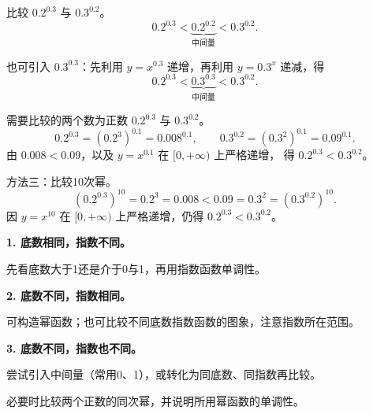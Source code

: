 \begin{frame}[t,label=A10a3i]
  比较 $0.2^{0.3}$ 与 $0.3^{0.2}$。
  \pause
  \Analysis{幂函数 $y=x^{0.2}$ 在 $[0,+\infty)$ 上严格递增，
  指数函数 $y=0.2^x$ 在 $\mathbb R$ 上严格递减。因此}
  \[
    0.2^{0.3}<\underbrace{0.2^{0.2}}_{\text{中间量}}<0.3^{0.2}.
  \]
  \par\vspace{0.3cm}
  也可引入 $0.3^{0.3}$：先利用 $y=x^{0.3}$ 递增，再利用 $y=0.3^x$ 递减，得
  \[
    0.2^{0.3}<\underbrace{0.3^{0.3}}_{\text{中间量}}<0.3^{0.2}.
  \]
\end{frame}

\begin{frame}[t,label=A10a3p]
  需要比较的两个数为正数 $0.2^{0.3}$ 与 $0.3^{0.2}$。
  \pause
  \[
    0.2^{0.3}=(0.2^3)^{0.1}=0.008^{0.1},\qquad
    0.3^{0.2}=(0.3^2)^{0.1}=0.09^{0.1}.
  \]
  由 $0.008<0.09$，以及 $y=x^{0.1}$ 在 $[0,+\infty)$ 上严格递增，
  得 $0.2^{0.3}<0.3^{0.2}$。
  \par\vspace{0.2cm}
  方法三：比较10次幂。
  \[
    (0.2^{0.3})^{10}=0.2^3=0.008
    <0.09=0.3^2=(0.3^{0.2})^{10}.
  \]
  因 $y=x^{10}$ 在 $[0,+\infty)$ 上严格递增，仍得 $0.2^{0.3}<0.3^{0.2}$。
\end{frame}

\begin{frame}[t,label=A10m]
  \textbf{1. 底数相同，指数不同。}
  \par 先看底数大于1还是介于0与1，再用指数函数单调性。
  \pause
  \par\vspace{0.35cm}
  \textbf{2. 底数不同，指数相同。}
  \par 可构造幂函数；也可比较不同底数指数函数的图象，注意指数所在范围。
  \par\vspace{0.35cm}
  \textbf{3. 底数不同，指数也不同。}
  \par 尝试引入中间量（常用0、1），或转化为同底数、同指数再比较。
  \par 必要时比较两个正数的同次幂，并说明所用幂函数的单调性。
\end{frame}

